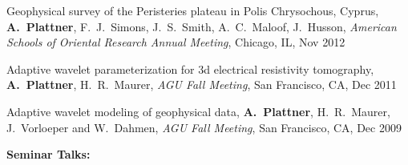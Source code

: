 \documentclass[10pt]{article}
\begin{document}
\spcp
Geophysical survey of the Peristeries plateau in Polis Chrysochous, Cyprus,
\textbf{A.~Plattner}, F.~J.~Simons, J.~S.~Smith, A.~C.~Maloof, J.~Husson,
\emph{American Schools of Oriental Research Annual Meeting}, Chicago, IL, Nov 2012

\spcp
Adaptive wavelet parameterization for 3d electrical resistivity tomography,
\textbf{A.~Plattner}, H.~R.~Maurer, 
\emph{AGU Fall Meeting}, San Francisco, CA, Dec 2011

\spcp
Adaptive wavelet modeling of geophysical data,
\textbf{A.~Plattner}, H.~R.~Maurer, J.~Vorloeper and W.~Dahmen, 
\emph{AGU Fall Meeting}, San Francisco, CA, Dec 2009




\spc
\textbf{\tsize Seminar Talks:}
\end{document}
